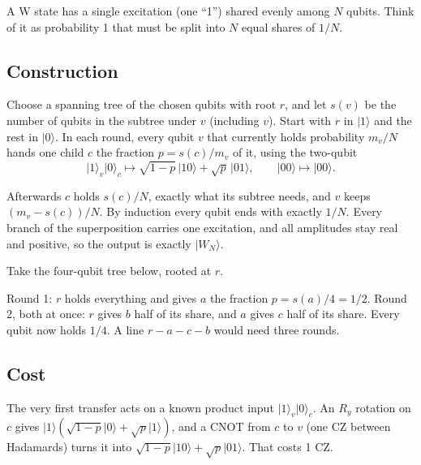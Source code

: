 \documentclass[11pt]{scrartcl}
\newcommand{\ket}[1]{\lvert #1\rangle}
\newcommand{\CZ}{\ensuremath{\mathrm{CZ}}}
\begin{document}
A W state has a single excitation (one ``1'') shared evenly among $N$ qubits. Think of it as
probability 1 that must be split into $N$ equal shares of $1/N$.

\subsection{Construction}

\begin{algorithm*}
  Choose a spanning tree of the chosen qubits with root $r$, and let $s(v)$ be the number of qubits
  in the subtree under $v$ (including $v$). Start with $r$ in $\ket1$ and the rest in $\ket0$. In
  each round, every qubit $v$ that currently holds probability $m_v/N$ hands one child $c$ the
  fraction $p=s(c)/m_v$ of it, using the two-qubit 
  \[
    \ket1_v\ket0_c\mapsto\sqrt{1-p}\,\ket{10}+\sqrt p\,\ket{01},\qquad \ket{00}\mapsto\ket{00}.
  \]
\end{algorithm*}

Afterwards $c$ holds $s(c)/N$, exactly what its subtree needs, and $v$ keeps $(m_v-s(c))/N$. By
induction every qubit ends with exactly $1/N$. Every branch of the superposition carries one
excitation, and all amplitudes stay real and positive, so the output is exactly $\ket{W_N}$.

\begin{example}
  Take the four-qubit tree below, rooted at $r$.
  \begin{center}
  \end{center}
  Round 1: $r$ holds everything and gives $a$ the fraction $p=s(a)/4=1/2$.
  Round 2, both at once: $r$ gives $b$ half of its share, and $a$ gives $c$ half of its share.
  Every qubit now holds $1/4$. A line $r-a-c-b$ would need three rounds.
\end{example}

\subsection{Cost}

The very first transfer acts on a known product input $\ket1_v\ket0_c$. An $R_y$ rotation on $c$
gives $\ket1(\sqrt{1-p}\ket0+\sqrt p\ket1)$, and a CNOT from $c$ to $v$ (one \CZ{} between
Hadamards) turns it into $\sqrt{1-p}\ket{10}+\sqrt p\ket{01}$. That costs 1 \CZ.
\end{document}
